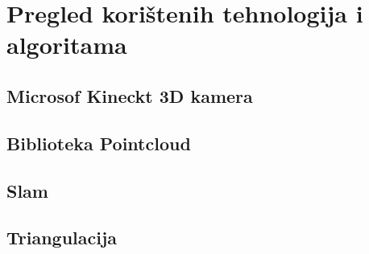 \newpage
\setcounter{figure}{0}

\section{Pregled korištenih tehnologija i algoritama} %
\label{sec:Tehnologija i teorija}


\subsection{Microsof Kineckt 3D kamera} %
\label{sub:Microsof Kineckt 3D kamera}


\subsection{Biblioteka Pointcloud} %
\label{sub:Biblioteka Pointcloud}



\subsection{Slam} %
\label{sub:Slam}


\subsection{Triangulacija} %
\label{sub:Triangulacija}



